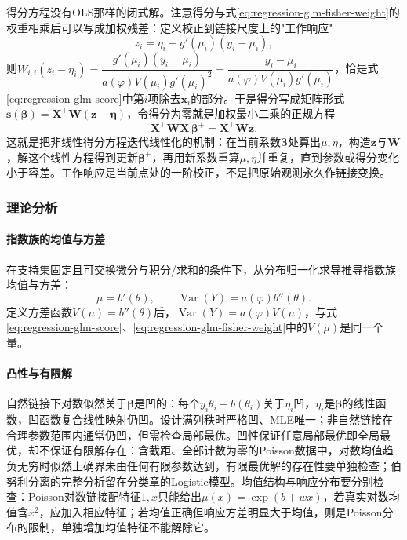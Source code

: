 得分方程没有OLS那样的闭式解。注意得分与式\eqref{eq:regression-glm-fisher-weight}的权重相乘后可以写成加权残差：定义校正到链接尺度上的"工作响应"
\begin{equation}
  z_i=\eta_i+g'(\mu_i)(y_i-\mu_i),
  \label{eq:regression-irls}
\end{equation}
则$W_{i,i}(z_i-\eta_i)=\dfrac{g'(\mu_i)(y_i-\mu_i)}{a(\varphi)V(\mu_i)g'(\mu_i)^2}=\dfrac{y_i-\mu_i}{a(\varphi)V(\mu_i)g'(\mu_i)}$，恰是式\eqref{eq:regression-glm-score}中第$i$项除去$\bm{x}_i$的部分。于是得分写成矩阵形式$\bm{s}(\bm{\beta})=\bm{X}^{\top}\bm{W}(\bm{z}-\bm{\eta})$，令得分为零就是加权最小二乘的正规方程
\[
  \bm{X}^{\top}\bm{W}\bm{X}\,\bm{\beta}^{+}=\bm{X}^{\top}\bm{W}\bm{z}.
\]
这就是把非线性得分方程迭代线性化的机制：在当前系数$\bm{\beta}$处算出$\mu,\eta$，构造$\bm{z}$与$\bm{W}$，解这个线性方程得到更新$\bm{\beta}^{+}$，再用新系数重算$\mu,\eta$并重复，直到参数或得分变化小于容差。工作响应是当前点处的一阶校正，不是把原始观测永久作链接变换。

\subsubsection{理论分析}
\label{sec:regression-glm-theory}

\paragraph{指数族的均值与方差}

在支持集固定且可交换微分与积分/求和的条件下，从分布归一化求导推导指数族均值与方差：
\begin{equation}
  \mu=b'(\theta),\qquad \operatorname{Var}(Y)=a(\varphi)b''(\theta).
  \label{eq:regression-glm-moments}
\end{equation}
定义方差函数$V(\mu)=b''(\theta)$后，$\operatorname{Var}(Y)=a(\varphi)V(\mu)$，与式\eqref{eq:regression-glm-score}、\eqref{eq:regression-glm-fisher-weight}中的$V(\mu)$是同一个量。

\paragraph{凸性与有限解}

自然链接下对数似然关于$\bm{\beta}$是凹的：每个$y_i\theta_i-b(\theta_i)$关于$\eta_i$凹，$\eta_i$是$\bm{\beta}$的线性函数，凹函数复合线性映射仍凹。设计满列秩时严格凹、MLE唯一；非自然链接在合理参数范围内通常仍凹，但需检查局部最优。凹性保证任意局部最优即全局最优，却不保证有限解存在：含截距、全部计数为零的Poisson数据中，对数均值趋负无穷时似然上确界未由任何有限参数达到，有限最优解的存在性要单独检查；伯努利分离的完整分析留在分类章的Logistic模型。均值结构与响应分布要分别检查：Poisson对数链接配特征$1,x$只能给出$\mu(x)=\exp(b+wx)$，若真实对数均值含$x^2$，应加入相应特征；若均值正确但响应方差明显大于均值，则是Poisson分布的限制，单独增加均值特征不能解除它。


